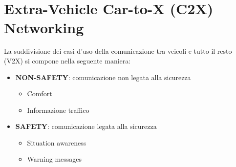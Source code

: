 \section{Extra-Vehicle Car-to-X (C2X) Networking}

La suddivisione dei casi d'uso della comunicazione tra veicoli e tutto il resto (V2X) si compone
nella seguente maniera:

\begin{itemize}
    \item \textbf{NON-SAFETY}: comunicazione non legata alla sicurezza
        \begin{itemize}
            \item Comfort
            \item Informazione traffico
        \end{itemize}
    \item \textbf{SAFETY}: comunicazione legata alla sicurezza
        \begin{itemize}
            \item Situation awareness
            \item Warning messages
        \end{itemize}
\end{itemize}
